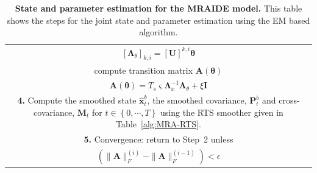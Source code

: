 \documentclass[review,authoryear,3p]{elsarticle}
\begin{document}
\begin{table}[!ht]
\begin{tabular}{|c|}
$\left[ \boldsymbol\Lambda_{\theta}\right] _{k,i}=\left[ \mathbf U\right]^{k,i}\boldsymbol\theta$\\
\multicolumn{1}{|p{16cm}|}{compute transition matrix $\mathbf A(\boldsymbol\theta)$ } \\
$\mathbf A(\boldsymbol \theta) = T_s\varsigma\mathbf{\Lambda}_{x}^{-1}\mathbf{\Lambda}_{\theta}+\xi\mathbf I$\\
\hline
\multicolumn{1}{|p{16cm}|}{\textbf{4.} Compute the smoothed state $\hat{\mathbf x}_t^b$, the smoothed covariance, $\mathbf P^b_t$ and cross-covariance, $\mathbf M_t$ for $t\in\left\lbrace 0,\cdots,T\right\rbrace $ using the RTS smoother given in Table~\ref{alg:MRA-RTS}.}\\  
\hline
\multicolumn{1}{|p{16cm}|}{\textbf{5.} Convergence: return to Step~2 unless }\\
$ \left(\parallel \mathbf{A} \parallel_{F}^{(i)}-\parallel \mathbf{A} \parallel_{F}^{(i-1)}\right)<\epsilon$\\
\hline
\end{tabular}
\caption{\textbf{State and parameter estimation for the MRAIDE model.} This table shows the steps for the joint state and parameter estimation using the EM based algorithm.}
\label{alg:EMsteps}
\end{table}
\renewcommand{\arraystretch}{1}
\clearpage
\newpage 
\end{document}
